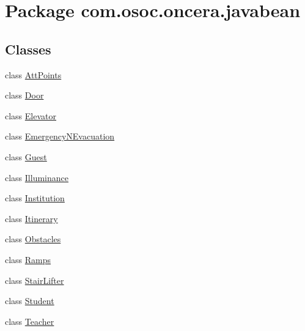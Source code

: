 \hypertarget{namespacecom_1_1osoc_1_1oncera_1_1javabean}{}\section{Package com.\+osoc.\+oncera.\+javabean}
\label{namespacecom_1_1osoc_1_1oncera_1_1javabean}
\subsection*{Classes}
\begin{DoxyCompactItemize}
\item 
class \mbox{\hyperlink{classcom_1_1osoc_1_1oncera_1_1javabean_1_1_att_points}{Att\+Points}}
\item 
class \mbox{\hyperlink{classcom_1_1osoc_1_1oncera_1_1javabean_1_1_door}{Door}}
\item 
class \mbox{\hyperlink{classcom_1_1osoc_1_1oncera_1_1javabean_1_1_elevator}{Elevator}}
\item 
class \mbox{\hyperlink{classcom_1_1osoc_1_1oncera_1_1javabean_1_1_emergency_n_evacuation}{Emergency\+N\+Evacuation}}
\item 
class \mbox{\hyperlink{classcom_1_1osoc_1_1oncera_1_1javabean_1_1_guest}{Guest}}
\item 
class \mbox{\hyperlink{classcom_1_1osoc_1_1oncera_1_1javabean_1_1_illuminance}{Illuminance}}
\item 
class \mbox{\hyperlink{classcom_1_1osoc_1_1oncera_1_1javabean_1_1_institution}{Institution}}
\item 
class \mbox{\hyperlink{classcom_1_1osoc_1_1oncera_1_1javabean_1_1_itinerary}{Itinerary}}
\item 
class \mbox{\hyperlink{classcom_1_1osoc_1_1oncera_1_1javabean_1_1_obstacles}{Obstacles}}
\item 
class \mbox{\hyperlink{classcom_1_1osoc_1_1oncera_1_1javabean_1_1_ramps}{Ramps}}
\item 
class \mbox{\hyperlink{classcom_1_1osoc_1_1oncera_1_1javabean_1_1_stair_lifter}{Stair\+Lifter}}
\item 
class \mbox{\hyperlink{classcom_1_1osoc_1_1oncera_1_1javabean_1_1_student}{Student}}
\item 
class \mbox{\hyperlink{classcom_1_1osoc_1_1oncera_1_1javabean_1_1_teacher}{Teacher}}
\end{DoxyCompactItemize}
